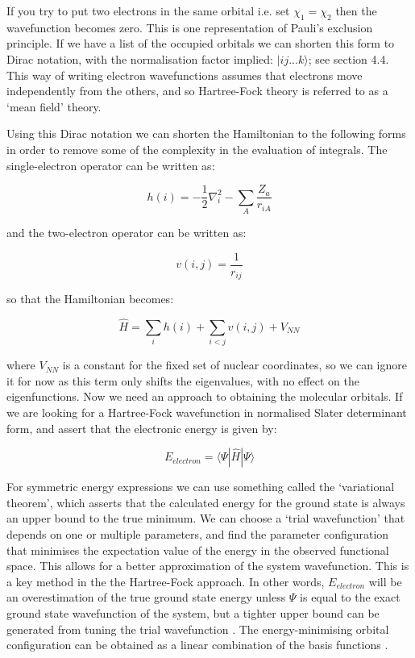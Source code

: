 \documentclass[10pt]{article}
\begin{document}
If you try to put two electrons in the same orbital i.e. set $\chi_1 = \chi_2$ then the wavefunction becomes zero. This is one representation of Pauli's exclusion principle. If we have a list of the occupied orbitals we can shorten this form to Dirac notation, with the normalisation factor implied: $|ij...k\rangle$; see section 4.4. This way of writing electron wavefunctions assumes that electrons move independently from the others, and so Hartree-Fock theory is referred to as a `mean field' theory. 

Using this Dirac notation we can shorten the Hamiltonian to the following forms in order to remove some of the complexity in the evaluation of integrals. The single-electron operator can be written as:

\begin{equation*}
	h(i) = -\frac{1}{2}\nabla_i^2-\sum_A\frac{Z_a}{r_{iA}}
\end{equation*}

and the two-electron operator can be written as:

\begin{equation*}
	v(i,j)=\frac{1}{r_{ij}}
\end{equation*}

so that the Hamiltonian becomes:

\begin{equation*}
	\hat{H} = \sum_i h(i) + \sum_{i<j}v(i,j) + V_{NN}
\end{equation*}

where $V_{NN}$ is a constant for the fixed set of nuclear coordinates, so we can ignore it for now as this term only shifts the eigenvalues, with no effect on the eigenfunctions. Now we need an approach to obtaining the molecular orbitals. If we are looking for a Hartree-Fock wavefunction in normalised Slater determinant form, and assert that the electronic energy is given by:

\begin{equation*}
	E_{electron} = \langle\Psi|\hat{H}|\Psi\rangle
\end{equation*}

For symmetric energy expressions we can use something called the `variational theorem', which asserts that the calculated energy for the ground state is always an upper bound to the true minimum. We can choose a `trial wavefunction' that depends on one or multiple parameters, and find the parameter configuration that minimises the expectation value of the energy in the observed functional space. This allows for a better approximation of the system wavefunction. This is a key method in the the Hartree-Fock approach. In other words, $E_{electron}$ will be an overestimation of the true ground state energy unless $\Psi$ is equal to the exact ground state wavefunction of the system, but a tighter upper bound can be generated from tuning the trial wavefunction \cite{sakurai1994modern}.  The energy-minimising orbital configuration can be obtained as a linear combination of the basis functions \cite{sherrill2000introduction}. 
\end{document}
